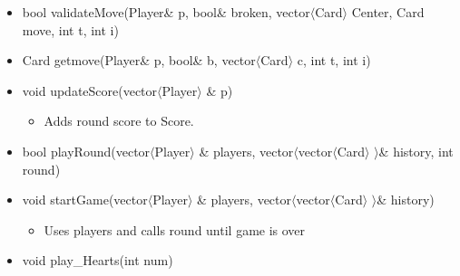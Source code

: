 \documentclass[]{scrartcl}
\begin{document}
\begin{itemize}
\begin{itemize}
 		\end{itemize}
 	\item bool validateMove(Player\& p, bool\& broken, vector$\langle$Card$\rangle$  Center, Card move, int t, int i)
 	\item Card getmove(Player\& p, bool\& b, vector$\langle$Card$\rangle$  c, int t, int i)
 	\item void updateScore(vector$\langle$Player$\rangle$ \& p)
 		\begin{itemize}
 			\item Adds round score to Score.
 		\end{itemize}
 	\item bool playRound(vector$\langle$Player$\rangle$ \& players, vector$\langle$vector$\langle$Card$\rangle$ $\rangle$\& history, int round)
 	\item void startGame(vector$\langle$Player$\rangle$ \& players, vector$\langle$vector$\langle$Card$\rangle$ $\rangle$\& history)
 		\begin{itemize}
 			\item  Uses players and calls round until game is over
 		\end{itemize}
 	\item void play\_Hearts(int num)

 \end{itemize}

\newpage
\end{document}
